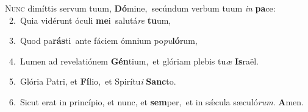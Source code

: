 \lettrine{\initial\textcolor{\initialcolor}{N}}{unc} dimíttis servum tuum, \textbf{Dó}\-mine,~\star secúndum verbum tuum \textit{in} \textbf{pa}\-ce:\\
{\numbfont\textcolor{\numbcolor}{~2.}}~Quia vidérunt óculi \textbf{me}\-i~\star salutá\textit{re} \textbf{tu}\-um,\par
{\numbfont\textcolor{\numbcolor}{~3.}}~Quod pa\-\textbf{rás}\-ti~\star ante fáciem ómnium po\-\textit{pu}\-\textbf{ló}rum,\par
{\numbfont\textcolor{\numbcolor}{~4.}}~Lumen ad revelatiónem \textbf{Gén}\-tium,~\star et glóriam plebis tu\textit{æ} \textbf{Is}\-raël.\par
{\numbfont\textcolor{\numbcolor}{~5.}}~Glória Patri, et \textbf{Fí}\-lio,~\star et Spirítu\textit{i} \textbf{Sanc}\-to.\par
{\numbfont\textcolor{\numbcolor}{~6.}}~Sicut erat in princípio, et nunc, et \textbf{sem}\-per,~\star et in sǽcula sæculó\-\textit{rum}\-. \textbf{A}\-men.\par
